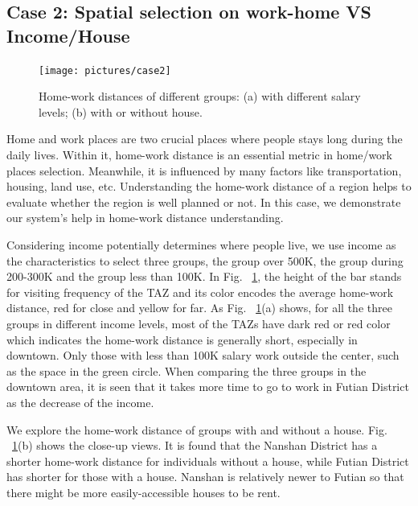 \documentclass{ieeeaccess}
\begin{document}
\subsection{Case 2: Spatial selection on work-home VS Income/House}


\begin{figure}[htb!]
 \centering %
 \texttt{[image: pictures/case2]}
 \caption{Home-work distances of different groups: (a) with different salary levels; (b) with or without house.}
 \label{case2}
\end{figure}

Home and work places are two crucial places where people stays long during the daily lives. Within it, home-work distance is an essential metric in home/work places selection. Meanwhile, it is influenced by many factors like transportation, housing, land use, etc. Understanding the home-work distance of a region helps to evaluate whether the region is well planned or not. In this case, we demonstrate our system's help in home-work distance understanding.

Considering income potentially determines where people live, we use income as the characteristics to select three groups, the group over 500K, the group during 200-300K and the group less than 100K. In Fig. ~\ref{case2}, the height of the bar stands for visiting frequency of the TAZ and its color encodes the average home-work distance, red for close and yellow for far. As Fig. ~\ref{case2}(a) shows, for all the three groups in different income levels, most of the TAZs have dark red or red color which indicates the home-work distance is generally short, especially in downtown. Only those with less than 100K salary work outside the center, such as the space in the green circle. When comparing the three groups in the downtown area, it is seen that it takes more time to go to work in Futian District as the decrease of the income.

We explore the home-work distance of groups with and without a house. Fig. ~\ref{case2}(b) shows the close-up views. It is found that the Nanshan District has a shorter home-work distance for individuals without a house, while Futian District has shorter for those with a house. Nanshan is relatively newer to Futian so that there might be more easily-accessible houses to be rent.
\end{document}
